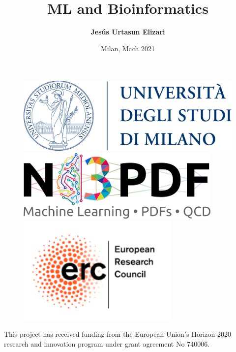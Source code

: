 \documentclass[aspectratio=43]{beamer}
\title[ML and Bioinformatics]{ML and Bioinformatics}
\author{\textbf {Jes\'us Urtasun Elizari}}
\date{Milan, Mach 2021}
\begin{document}
\begin{frame}

	\vspace{1.0 cm}
	
	
	\vspace{0.25 cm}

	\begin{figure}
		\includegraphics[width = 3.0 cm]{plots/unimi.png}
		\hfill
		\includegraphics[width = 2.5 cm]{plots/n3pdf.png}
		\hfill
		\includegraphics[width = 3.0 cm]{plots/erc.png}
		\endminipage
	\end{figure}

	\vspace{1.0 cm}
	
	{\scriptsize \color{blue} This project has received funding from the European Union$'$s Horizon 2020 research and innovation program under grant agreement No 740006.}

\end{frame}
\end{document}
